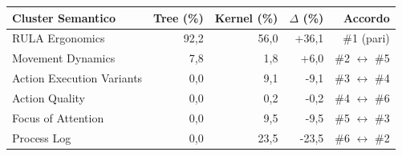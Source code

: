 \begin{tabular*}{\linewidth}{@{}l@{\extracolsep{\fill}}rrrr@{}}
\toprule
\textbf{Cluster Semantico} & \textbf{Tree (\%)} & \textbf{Kernel (\%)} & \textbf{$\Delta$ (\%)} & \textbf{Accordo} \\
\midrule
RULA Ergonomics & 92{,}2 & 56{,}0 & +36{,}1 & \#1 (pari) \\
Movement Dynamics & 7{,}8 & 1{,}8 & +6{,}0 & \#2 $\leftrightarrow$ \#5 \\
Action Execution Variants & 0{,}0 & 9{,}1 & -9{,}1 & \#3 $\leftrightarrow$ \#4 \\
Action Quality & 0{,}0 & 0{,}2 & -0{,}2 & \#4 $\leftrightarrow$ \#6 \\
Focus of Attention & 0{,}0 & 9{,}5 & -9{,}5 & \#5 $\leftrightarrow$ \#3 \\
Process Log & 0{,}0 & 23{,}5 & -23{,}5 & \#6 $\leftrightarrow$ \#2 \\
\bottomrule
\end{tabular*}
